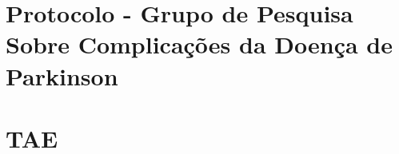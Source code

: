 \begin{anexosenv}
	\partapendices
	\chapter{Protocolo - Grupo de Pesquisa Sobre Complicações
	da Doença de Parkinson}  
	\label{apendicprotocolo}
		
	\chapter{TAE}
	\label{apendicetae}
		

\end{anexosenv}